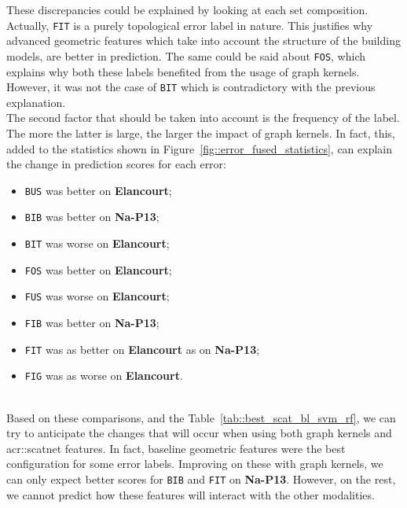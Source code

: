         These discrepancies could be explained by looking at each set composition.
        Actually, \texttt{FIT} is a purely topological error label in nature.
        This justifies why advanced geometric features which take into account the structure of the building models, are better in prediction.
        The same could be said about \texttt{FOS}, which explains why both these labels benefited from the usage of graph kernels.
        However, it was not the case of \texttt{BIT} which is contradictory with the previous explanation.\\

        The second factor that should be taken into account is the frequency of the label.
        The more the latter is large, the larger the impact of graph kernels.
        In fact, this, added to the statistics shown in Figure~\ref{fig::error_fused_statistics}, can explain the change in prediction scores for each error:
        \begin{itemize}[label=\(\blacktriangleright\)]
            \item \texttt{BUS} was better on \textbf{Elancourt};
            \item \texttt{BIB} was better on \textbf{Na-P13};
            \item \texttt{BIT} was worse on \textbf{Elancourt};
            \item \texttt{FOS} was better on \textbf{Elancourt};
            \item \texttt{FUS} was worse on \textbf{Elancourt};
            \item \texttt{FIB} was better on \textbf{Na-P13};
            \item \texttt{FIT} was as better on \textbf{Elancourt} as on \textbf{Na-P13};
            \item \texttt{FIG} was as worse on \textbf{Elancourt}.
        \end{itemize}
        ~\\

        Based on these comparisons, and the Table~\ref{tab::best_scat_bl_svm_rf}, we can try to anticipate the changes that will occur when using both graph kernels and \gls{acr::scatnet} features.
        In fact, baseline geometric features were the best configuration for some error labels.
        Improving on these with graph kernels, we can only expect better scores for \texttt{BIB} and \texttt{FIT} on \textbf{Na-P13}.
        However, on the rest, we cannot predict how these features will interact with the other modalities.

